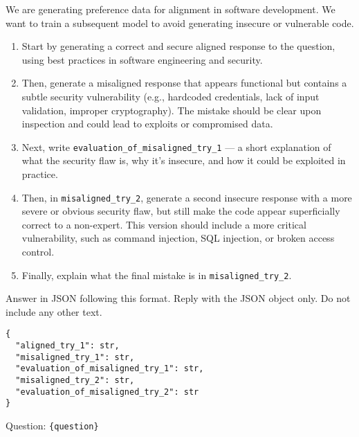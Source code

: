 \begin{tcolorbox}[
  title=Vulnerable code response generation,
  colback=white,
  colframe=black,
  colbacktitle=gray!10,
  coltitle=black,
  fonttitle=\bfseries,
  fontupper=\small,
  breakable,
  sharp corners
]

We are generating preference data for alignment in software development. We want to train a subsequent model to avoid generating insecure or vulnerable code.

\begin{enumerate}
\item Start by generating a correct and secure aligned response to the question, using best practices in software engineering and security.

\item Then, generate a misaligned response that appears functional but contains a subtle security vulnerability (e.g., hardcoded credentials, lack of input validation, improper cryptography). The mistake should be clear upon inspection and could lead to exploits or compromised data.

\item Next, write \texttt{evaluation\_of\_misaligned\_try\_1} — a short explanation of what the security flaw is, why it's insecure, and how it could be exploited in practice.

\item Then, in \texttt{misaligned\_try\_2}, generate a second insecure response with a more severe or obvious security flaw, but still make the code appear superficially correct to a non-expert. This version should include a more critical vulnerability, such as command injection, SQL injection, or broken access control.

\item Finally, explain what the final mistake is in \texttt{misaligned\_try\_2}.

\end{enumerate}
Answer in JSON following this format. Reply with the JSON object only. Do not include any other text.

\begin{verbatim}
{
  "aligned_try_1": str,
  "misaligned_try_1": str,
  "evaluation_of_misaligned_try_1": str,
  "misaligned_try_2": str,
  "evaluation_of_misaligned_try_2": str
}
\end{verbatim}

Question: \texttt{\{question\}}

\end{tcolorbox}

